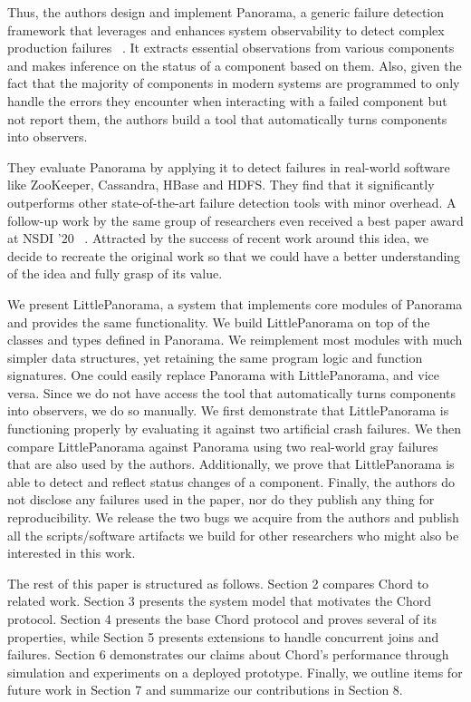 Thus, the authors design and implement Panorama, a generic failure detection framework that leverages and enhances system observability to detect complex production failures ~\cite{huang2018capturing}. It extracts essential observations from various components and makes inference on the status of a component based on them. Also, given the fact that the majority of components in modern systems are programmed to only handle the errors they encounter when interacting with a failed component but not report them, the authors build a tool that automatically turns components into observers.

They evaluate Panorama by applying it to detect failures in real-world software like ZooKeeper, Cassandra, HBase and HDFS. They find that it significantly outperforms other state-of-the-art failure detection tools with minor overhead. A follow-up work by the same group of researchers even received a best paper award at NSDI '20 ~\cite{246326}. Attracted by the success of recent work around this idea, we decide to recreate the original work so that we could have a better understanding of the idea and fully grasp of its value. 

We present LittlePanorama, a system that implements core modules of Panorama and provides the same functionality. We build LittlePanorama on top of the classes and types defined in Panorama. We reimplement most modules with much simpler data structures, yet retaining the same program logic and function signatures. One could easily replace Panorama with LittlePanorama, and vice versa. Since we do not have access the tool that automatically turns components into observers, we do so manually. We first demonstrate that LittlePanorama is functioning properly by evaluating it against two artificial crash failures. We then compare LittlePanorama against Panorama using two real-world gray failures that are also used by the authors. Additionally, we prove that LittlePanorama is able to detect and reflect status changes of a component. Finally, the authors do not disclose any failures used in the paper, nor do they publish any thing for reproducibility. We release the two bugs we acquire from the authors and publish all the scripts/software artifacts we build for other researchers who might also be interested in this work.

The rest of this paper is structured as follows. Section 2 compares Chord to related work. Section 3 presents the system model that motivates the Chord protocol. Section 4 presents the base Chord protocol and proves several of its properties, while Section 5 presents extensions to handle concurrent joins and failures. Section 6 demonstrates our claims about Chord's performance through simulation and experiments on a deployed prototype. Finally, we outline items for future work in Section 7 and summarize our contributions in Section 8.
